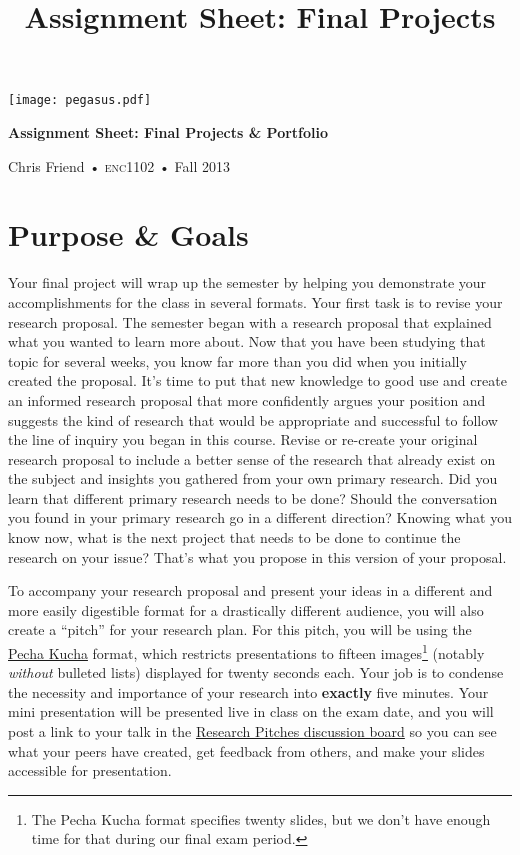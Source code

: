 \documentclass[11pt,oneside]{amsart}	%
\title[Final Projects]{Assignment Sheet: Final Projects}
\begin{document}
%
\thispagestyle{empty}

\vspace{-2in}
\begin{center}
\huge
{\texttt{[image: pegasus.pdf]}}

\textbf{Assignment Sheet: Final Projects \& Portfolio}

{\normalsize Chris Friend • \textsc{enc1102} • Fall 2013}
\end{center}
\vspace{1.5\baselineskip}

\section{Purpose \& Goals} %
\label{sec:purpose}
Your final project will wrap up the semester by helping you demonstrate your accomplishments for the class in several formats. Your first task is to revise your research proposal. The semester began with a research proposal that explained what you wanted to learn more about. Now that you have been studying that topic for several weeks, you know far more than you did when you initially created the proposal. It's time to put that new knowledge to good use and create an informed research proposal that more confidently argues your position and suggests the kind of research that would be appropriate and successful to follow the line of inquiry you began in this course. Revise or re-create your original research proposal to include a better sense of the research that already exist on the subject and insights you gathered from your own primary research. Did you learn that different primary research needs to be done? Should the conversation you found in your primary research go in a different direction? Knowing what you know now, what is the next project that needs to be done to continue the research on your issue? That's what you propose in this version of your proposal.

To accompany your research proposal and present your ideas in a different and more easily digestible format for a drastically different audience, you will also create a ``pitch'' for your research plan. For this pitch, you will be using the \href{http://www.pechakucha.org}{Pecha Kucha} format, which restricts presentations to fifteen images\footnote{The Pecha Kucha format specifies twenty slides, but we don't have enough time for that during our final exam period.} (notably \emph{without} bulleted lists) displayed for twenty seconds each. Your job is to condense the necessity and importance of your research into \textbf{exactly} five minutes. Your mini presentation will be presented live in class on the exam date, and you will post a link to your talk in the \href{https://webcourses2c.instructure.com/courses/985581/discussion_topics/1918132}{Research Pitches discussion board} so you can see what your peers have created, get feedback from others, and make your slides accessible for presentation.
\end{document}
